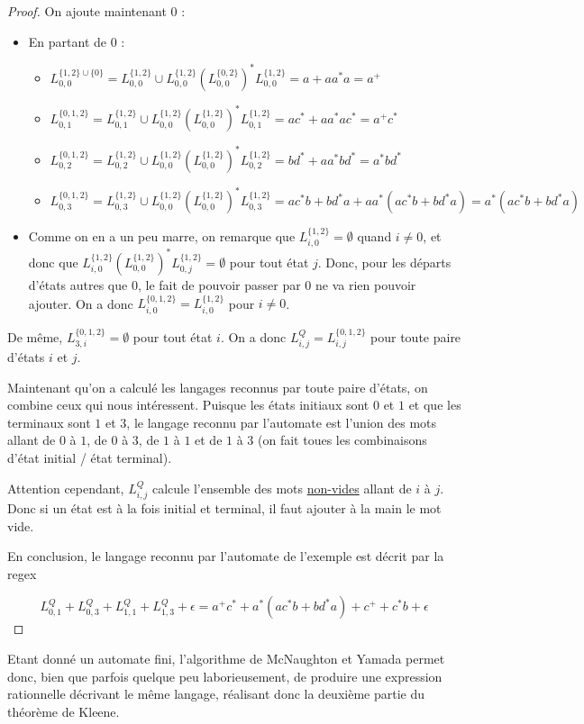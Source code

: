 \begin{proof}
On ajoute maintenant $0$ : 


\begin{itemize}
\item En partant de $0$ :
   \begin{itemize}
	 \item $L_{0,0}^{\{1,2\} \cup \{0\}} = L_{0,0}^{\{1,2\}} \cup L_{0,0}^{\{1,2\}}(L_{0,0}^{\{0,2\}})^*L_{0,0}^{\{1,2\}} = a + aa^*a = a^+$
	 \item $L_{0,1}^{\{0,1,2\}} = L_{0,1}^{\{1,2\}} \cup L_{0,0}^{\{1,2\}}(L_{0,0}^{\{1,2\}})^*L_{0,1}^{\{1,2\}} = ac^* + aa^*ac^* = a^+c^*$
	 \item $L_{0,2}^{\{0,1,2\}} = L_{0,2}^{\{1,2\}} \cup L_{0,0}^{\{1,2\}}(L_{0,0}^{\{1,2\}})^*L_{0,2}^{\{1,2\}} = bd^* + aa^*bd^* = a^*bd^*$
	 \item $L_{0,3}^{\{0,1,2\}} = L_{0,3}^{\{1,2\}} \cup L_{0,0}^{\{1,2\}}(L_{0,0}^{\{1,2\}})^*L_{0,3}^{\{1,2\}} = ac^*b + bd^*a + aa^*(ac^*b + bd^*a) = a^*(ac^*b + bd^*a)$
   \end{itemize}
\item Comme on en a un peu marre, on remarque que $L_{i,0}^{\{1,2\}} = \emptyset$ quand $i \neq 0$, et donc que $L_{i,0}^{\{1,2\}}(L_{0,0}^{\{1,2\}})^*L_{0,j}^{\{1,2\}} = \emptyset$ pour tout état $j$. Donc, pour les départs d'états autres que $0$, le fait de pouvoir passer par $0$ ne va rien pouvoir ajouter. On a donc $L_{i,0}^{\{0,1,2\}} = L_{i,0}^{\{1,2\}}$ pour $i \neq 0$.
\end{itemize}

De même, $L_{3,i}^{\{0,1,2\}} = \emptyset$ pour tout état $i$. On a donc $L_{i,j}^Q = L_{i,j}^{\{0,1,2\}}$ pour toute paire d'états $i$ et $j$. 


Maintenant qu'on a calculé les langages reconnus par toute paire d'états, on combine ceux qui nous intéressent. Puisque les états initiaux sont $0$ et $1$ et que les terminaux sont $1$ et $3$, le langage reconnu par l'automate est l'union des mots allant de $0$ à $1$, de $0$ à $3$, de $1$ à $1$ et de $1$ à $3$ (on fait toues les combinaisons d'état initial / état terminal).

Attention cependant, $L_{i,j}^Q$ calcule l'ensemble des mots \underline{non-vides} allant de $i$ à $j$. Donc si un état est à la fois initial et terminal, il faut ajouter à la main le mot vide.

En conclusion, le langage reconnu par l'automate de l'exemple est décrit par la regex 

\[
L_{0,1}^Q + L_{0,3}^Q + L_{1,1}^Q + L_{1,3}^Q + \epsilon = a^+c^* + a^*(ac^*b + bd^*a) + c^+ + c^*b + \epsilon
\]

\end{proof}

Etant donné un automate fini, l'algorithme de McNaughton et Yamada permet donc, bien que parfois quelque peu laborieusement, de produire une expression rationnelle décrivant le même langage, réalisant donc la deuxième partie du théorème de Kleene.